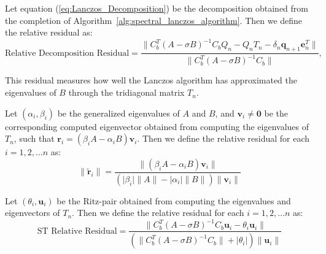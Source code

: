 \begin{definition}\label{def:DecompositionResidual}
	Let equation (\ref{eq:Lanczos_Decomposition}) be the decomposition obtained from the completion of Algorithm~\ref{alg:spectral_lanczos_algorithm}. Then we define the relative residual as:
	\begin{equation}\label{eq:DecompositionResidual}
		\text{Relative Decomposition Residual} = \frac{\|C_b^T (A-\sigma B)^{-1} C_bQ_n - Q_nT_n - \delta_{n}\mathbf{q}_{n+1}\mathbf{e}_n^T\|}{\|C_b^T (A-\sigma B)^{-1} C_b\|},
	\end{equation}
\end{definition}
This residual measures how well the Lanczos algorithm has approximated the eigenvalues of $B$ through the tridiagonal matrix $T_n$.

\begin{definition}\label{def:GeneralizedRelativeResidual}
	Let $(\alpha_i, \beta_i)$ be the generalized eigenvalues of $A$ and $B$, and $\mathbf{v}_i \neq \mathbf{0}$ be the corresponding computed eigenvector obtained from computing the eigenvalues of $T_n$, such that $\mathbf{r}_i = (\beta_i A - \alpha_i B)\mathbf{v}_i$. Then we define the relative residual for each $i = 1, 2, \ldots n$ as:
	\begin{equation}\label{eq:GeneralizedResidual}
		\|\tilde{\mathbf{r}}_i\| = \frac{\| (\beta_i A - \alpha_i B)\mathbf{v}_i \| }{(\lvert \beta_i \rvert \|A\| - \lvert \alpha_i \rvert \|B\|)\|\mathbf{v}_i\| }
	\end{equation}
\end{definition}

\begin{definition}\label{def:SpectralTransformedResidual}
	Let $(\theta_i, \mathbf{u}_i)$ be the Ritz-pair obtained from computing the eigenvalues and eigenvectors of $T_n$. Then we define the relative residual for each $i = 1, 2, \ldots n$ as:
	\begin{equation}\label{eq:STResidual}
		\text{ST Relative Residual} = \frac{\| C_b^T(A - \sigma B)^{-1}C_b \mathbf{u}_i - \theta_i \mathbf{u}_i \| }{( \| C_b^T(A - \sigma B)^{-1}C_b \| + \lvert \theta_i \rvert)\|\mathbf{u}_i\| }
	\end{equation}
\end{definition}

